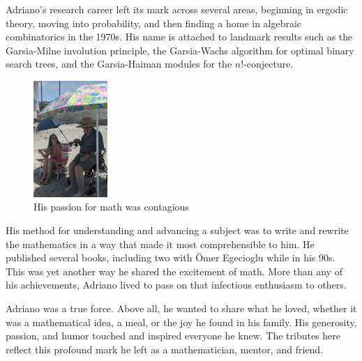\documentclass{notices}
\begin{document}
Adriano's research career left its mark across several areas, 
beginning in ergodic theory, moving into probability, and then finding a home in algebraic combinatorics in the 1970s. 
His name is attached to landmark results such as the Garsia-Milne involution principle, the Garsia-Wachs algorithm 
for optimal binary search trees, and the Garsia-Haiman modules for the $n!$-conjecture. 

  \begin{figure}
  \centering
\includegraphics[width=1.1in]{mathtalkwadriano.jpg} \\
{\footnotesize 
His passion for math was contagious
}
\end{figure}

His method for understanding and advancing a subject was to write and rewrite the mathematics in a way that made it most comprehensible to him. He published several books, including two with \"Omer Egecioglu while in his 90s.
This was yet another way he shared the excitement of math. 
More than any of his achievements, Adriano lived to pass on that infectious enthusiasm to others.



Adriano was a true force.  Above all, he wanted to share what he loved, whether 
it was a mathematical idea, a meal, or the joy he found in his family.
His generosity, passion, and humor touched and inspired everyone he knew.  
The tributes here
reflect this profound mark he left as a mathematician, 
mentor, and friend.
\end{document}
